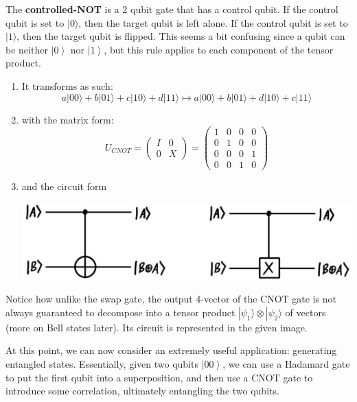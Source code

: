 \documentclass{article}
\newcommand{\ket}[1]{\ensuremath{\left|#1\right\rangle}}
\begin{document}
    \begin{definition}
      The \textbf{controlled-NOT} is a 2 qubit gate that has a control qubit. If the control qubit is set to $|0\rangle$, then the target qubit is left alone. If the control qubit is set to $|1\rangle$, then the target qubit is flipped. This seems a bit confusing since a qubit can be neither $\ket{0}$ nor $\ket{1}$, but this rule applies to each component of the tensor product. 
      \begin{enumerate} 
        \item It transforms as such: 
          \begin{equation} 
            a |00\rangle + b |01\rangle + c|10\rangle + d|11\rangle \mapsto a |00\rangle + b |01\rangle + d|10\rangle + c|11\rangle
          \end{equation}
        \item with the matrix form: 
          \begin{equation} 
            U_{CNOT} = \begin{pmatrix} I & 0 \\ 0 & X \end{pmatrix} = \begin{pmatrix} 1&0&0&0\\0&1&0&0\\0&0&0&1\\0&0&1&0 \end{pmatrix}
          \end{equation}
        \item and the circuit form
          \begin{center}
            \includegraphics[scale=0.3]{img/Control_Not_gate.jpg}
          \end{center}
      \end{enumerate} 
      Notice how unlike the swap gate, the output 4-vector of the CNOT gate is not always guaranteed to decompose into a tensor product $|\psi_1 \rangle \otimes |\psi_2 \rangle$ of vectors (more on Bell states later). Its circuit is represented in the given image.
    \end{definition}

    At this point, we can now consider an extremely useful application: generating entangled states. Essentially, given two qubits $\ket{00}$, we can use a Hadamard gate to put the first qubit into a superposition, and then use a CNOT gate to introduce some correlation, ultimately entangling the two qubits. 
\end{document}
